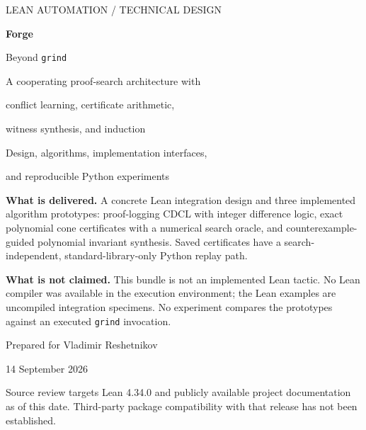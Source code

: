 \documentclass[11pt,letterpaper]{article}
\newcommand{\grind}{\texttt{grind}}
\theoremstyle{definition}\newtheorem{definition}[proposition]{Definition}
\begin{document}
\begin{titlepage}
\vspace*{0.6in}
{\color{muted}\Large LEAN AUTOMATION / TECHNICAL DESIGN}\par
\vspace{0.4in}
{\color{ink}\fontsize{40}{45}\selectfont\bfseries Forge}\par
\vspace{0.12in}
{\color{ink}\LARGE Beyond \texttt{grind}}\par
\vspace{0.3in}
{\Large A cooperating proof-search architecture with\par
conflict learning, certificate arithmetic,\par
witness synthesis, and induction}\par
\vspace{0.45in}
{\large Design, algorithms, implementation interfaces,\par
and reproducible Python experiments}\par
\vfill
\begin{keybox}
\textbf{What is delivered.} A concrete Lean integration design and three implemented algorithm prototypes: proof-logging CDCL with integer difference logic, exact polynomial cone certificates with a numerical search oracle, and counterexample-guided polynomial invariant synthesis. Saved certificates have a search-independent, standard-library-only Python replay path.

\textbf{What is not claimed.} This bundle is not an implemented Lean tactic. No Lean compiler was available in the execution environment; the Lean examples are uncompiled integration specimens. No experiment compares the prototypes against an executed \grind{} invocation.
\end{keybox}
\vspace{0.3in}
{\large Prepared for Vladimir Reshetnikov}\par
{\large 14 September 2026}\par
\vspace{0.1in}
{\small Source review targets Lean 4.34.0 and publicly available project documentation as of this date. Third-party package compatibility with that release has not been established.}
\end{titlepage}
\end{document}
